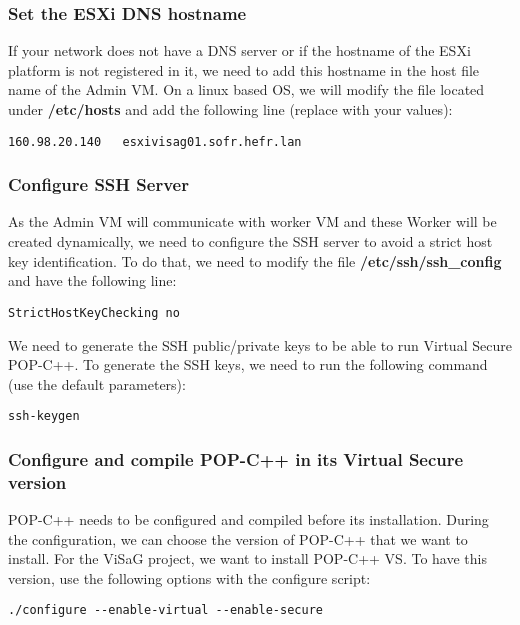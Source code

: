 \subsubsection{Set the ESXi DNS hostname}
\label{lb:dns}
If your network does not have a DNS server or if the hostname of the ESXi platform is not registered in it, we need to add this hostname in the host file name of the Admin VM. On a linux based OS, we will modify the file located under \textbf{/etc/hosts} and add the following line (replace with your values):\s

\begin{lstlisting}
160.98.20.140	esxivisag01.sofr.hefr.lan
\end{lstlisting}





\subsubsection{Configure SSH Server}
\label{lb:sshserver}
As the Admin VM will communicate with worker VM and these Worker will be created dynamically, we need to configure the SSH server to avoid a strict host key identification. To do that, we need to modify the file \textbf{/etc/ssh/ssh\_config} and have the following line:\s

\begin{lstlisting}
StrictHostKeyChecking no
\end{lstlisting} \s

We need to generate the SSH public/private keys to be able to run Virtual Secure POP-C++. To generate the SSH keys, we need to run the following command (use the default parameters):\s
\begin{lstlisting}
ssh-keygen
\end{lstlisting}






\subsubsection{Configure and compile POP-C++ in its Virtual Secure version}
\label{lb:popc_install}
POP-C++ needs to be configured and compiled before its installation. During the configuration, we can choose the version of POP-C++ that we want to install. For the ViSaG project, we want to install POP-C++ VS. To have this version, use the following options with the configure script: \s

\begin{lstlisting}
./configure --enable-virtual --enable-secure
\end{lstlisting}\s

